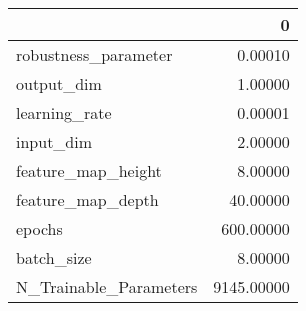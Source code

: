 \begin{tabular}{lr}
\toprule
{} &           0 \\
\midrule
robustness\_parameter   &     0.00010 \\
output\_dim             &     1.00000 \\
learning\_rate          &     0.00001 \\
input\_dim              &     2.00000 \\
feature\_map\_height     &     8.00000 \\
feature\_map\_depth      &    40.00000 \\
epochs                 &   600.00000 \\
batch\_size             &     8.00000 \\
N\_Trainable\_Parameters &  9145.00000 \\
\bottomrule
\end{tabular}
